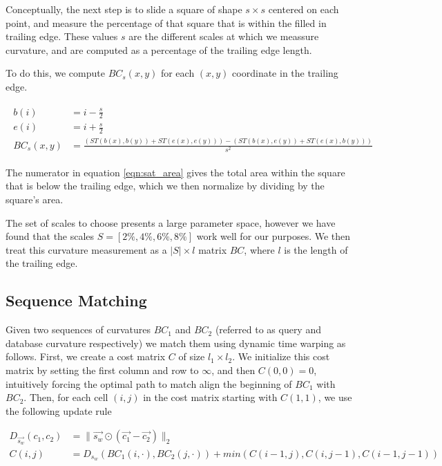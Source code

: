 Conceptually, the next step is to slide a square of shape $s \times s$ centered on each point, and measure the percentage of that square that is within the filled in trailing edge.
These values $s$ are the different scales at which we meassure curvature, and are computed as a percentage of the trailing edge length.

To do this, we compute $BC_s(x, y)$ for each $(x, y)$ coordinate in the trailing edge.

\begin{align} \label{eqn:sat_area}
\begin{split}
b(i) &= i - \frac{s}{2}\\
e(i) &= i + \frac{s}{2}\\
BC_s(x,y) &= \frac{(ST(b(x), b(y)) + ST(e(x), e(y))) - (ST(b(x), e(y)) + ST(e(x), b(y)))}{s^2}
\end{split}
\end{align}

The numerator in equation \eqref{eqn:sat_area} gives the total area within the square that is below the trailing edge, which we then normalize by dividing by the square's area.

The set of scales to choose presents a large parameter space, however we have found that the scales $S = [2\%, 4\%, 6\%, 8\%]$ work well for our purposes.
We then treat this curvature measurement as a $|S| \times l$ matrix $BC$, where $l$ is the length of the trailing edge.

\subsection{Sequence Matching}

Given two sequences of curvatures $BC_1$ and $BC_2$ (referred to as query and database curvature respectively) we match them using dynamic time warping as follows.
First, we create a cost matrix $C$ of size $l_1 \times l_2$. 
We initialize this cost matrix by setting the first column and row to $\infty$, and then $C(0,0) = 0$, intuitively forcing the optimal path to match align the beginning of $BC_1$ with $BC_2$.
Then, for each cell $(i,j)$ in the cost matrix starting with $C(1,1)$, we use the following update rule

\begin{align} 
\label{eqn:dtw_dist}
D_{\vec{s_w}}(c_1, c_2) &= \lVert \vec{s_w} \odot (\vec{c_1} - \vec{c_2}) \rVert_2\\
\label{eqn:dtw_update}
C(i,j) &= D_{s_w}(BC_1(i,\cdot),BC_2(j,\cdot)) + min(C(i-1,j), C(i,j-1), C(i-1, j-1))
\end{align}

